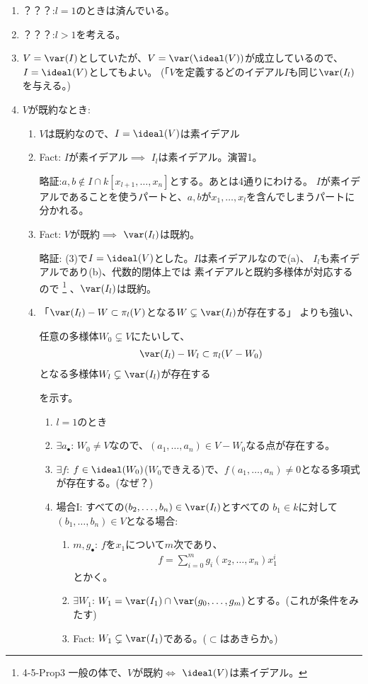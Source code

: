 \begin{enumerate}
  \item ？？？:$l=1$のときは済んでいる。
  \item ？？？:$l>1$を考える。

  \item
  $V=\var(I)$としていたが、$V=\var(\ideal(V))$が成立しているので、
  $I=\ideal(V)$としてもよい。
  (「$V$を定義するどのイデアル$I$も同じ$\var(I_l)$を与える。)
  \item
  $V$が既約なとき:
  \begin{enumerate}
    \item
    $V$は既約なので、$I=\ideal(V)$は素イデアル
    \item
    Fact: $I$が素イデアル$\implies$ $I_l$は素イデアル。演習1。

    略証:$a,b \notin I\cap k[x_{l+1},\dots,x_n]$とする。あとは4通りにわける。
    $I$が素イデアルであることを使うパートと、$a,b$が$x_1,\dots,x_l$を含んでしまうパートに分かれる。
    \item
    Fact: $V$が既約$\implies$ $\var(I_l)$は既約。

    略証: (3)で$I=\ideal(V)$とした。$I$は素イデアルなので(a)、
    $I_l$も素イデアルであり(b)、代数的閉体上では
    素イデアルと既約多様体が対応するので
    \footnote{4-5-Prop3 一般の体で、$V$が既約$\iff$ $\ideal(V)$は素イデアル。}
    、$\var(I_l)$は既約。
    \item
    「$\var(I_l)-W \subset \pi_l(V)$となる$W\subsetneq \var(I_l)$が存在する」
    よりも強い、
    \begin{framed}
      任意の多様体$W_0 \subsetneq V$にたいして、
      \begin{align}
        \var(I_l) - W_l \subset \pi_l(V-W_0)
      \end{align}
      となる多様体$W_l \subsetneq \var(I_l)$が存在する
    \end{framed}
    を示す。
    \begin{enumerate}
      \item $l=1$のとき
      \item $\exists a_\bullet$: $W_0\neq V$なので、$(a_1,\dots,a_n) \in V-W_0$なる点が存在する。
      \item $\exists f$: $f\in \ideal(W_0)$($W_0$できえる)で、$f(a_1,\dots,a_n) \neq 0$となる多項式が存在する。(なぜ？)
      \item 場合I: すべての$(b_2,\dots,b_n) \in \var(I_l)$とすべての
      $b_1 \in k$に対して$(b_1,\dots,b_n)\in V$となる場合:
      \begin{enumerate}
        \item $m,g_\bullet$: $f$を$x_1$について$m$次であり、
        \begin{align}
          f=\sum_{i=0}^m g_i(x_2,\dots,x_n) x_1^i
        \end{align}
        とかく。
        \item $\exists W_1$:
        $W_1 = \var(I_1) \cap \var(g_0,\dots,g_m)$とする。(これが条件をみたす)
        \item Fact: $W_1 \subsetneq \var(I_1)$である。($\subset$はあきらか。)


\end{enumerate}
\end{enumerate}
\end{enumerate}
\end{enumerate}
